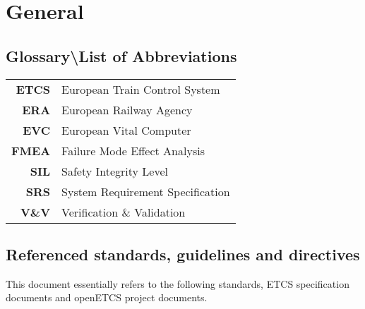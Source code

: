 \section{General}
\subsection{Glossary{\textbackslash}List of Abbreviations}
\label{sec:glossary}



\begin{tabular}{rl}
\label{tab:Glossary} 
\textbf{ETCS} & European Train Control System \\ 
\textbf{ERA} & European Railway Agency \\ 
\textbf{EVC} & European Vital Computer \\ 
\textbf{FMEA} & Failure Mode Effect Analysis \\ 
\textbf{SIL} & Safety Integrity Level \\ 
\textbf{SRS} & System Requirement Specification \\ 
\textbf{V\&V} & Verification \& Validation \\ 
\end{tabular}

\bigskip

\bigskip

\subsection{Referenced standards, guidelines and directives}
\bigskip
This document essentially refers to the following standards, ETCS specification documents and openETCS project documents.

